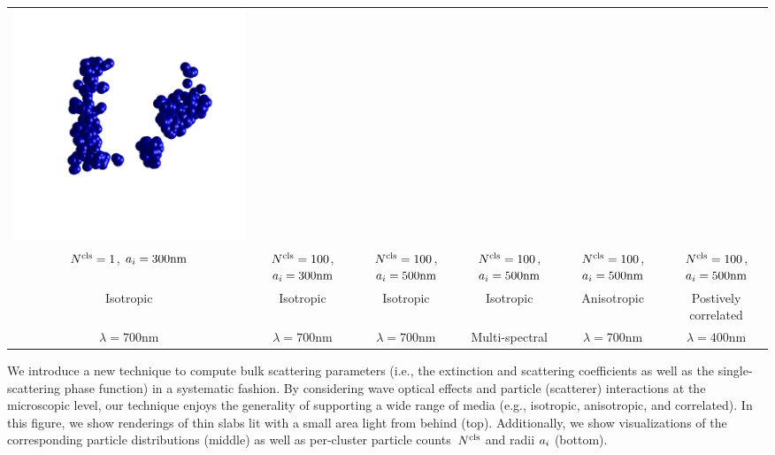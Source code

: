 \begin{teaserfigure}
\begin{tabular}{cccccc}
        \includegraphics[height=\resLen]{images/particle/pos.png}
        \\[-1em]
        ${N^\text{cls}}=1$, $a_i=300\text{nm}$ &
        ${N^\text{cls}}=100$, $a_i=300\text{nm}$ &
        ${N^\text{cls}}=100$, $a_i=500\text{nm}$ &
        ${N^\text{cls}}=100$, $a_i=500\text{nm}$ & 
        ${N^\text{cls}}=100$, $a_i=500\text{nm}$ &
        ${N^\text{cls}}=100$, $a_i=500\text{nm}$
        \\
        Isotropic & Isotropic & Isotropic & Isotropic & Anisotropic & Postively correlated
        \\
        $\lambda=700\text{nm}$ &
        $\lambda=700\text{nm}$ &
        $\lambda=700\text{nm}$ &
        Multi-spectral &
        $\lambda=700\text{nm}$ &
        $\lambda=400\text{nm}$
    \end{tabular}
    \caption{\label{fig:teaser}
        We introduce a new technique to compute bulk scattering parameters (i.e., the extinction and scattering coefficients as well as the single-scattering phase function) in a systematic fashion. By considering wave optical effects and particle (scatterer) interactions at the microscopic level, our technique enjoys the generality of supporting a wide range of media (e.g., isotropic, anisotropic, and correlated).
        In this figure, we show renderings of thin slabs lit with a small area light from behind (top).
        Additionally, we show visualizations of the corresponding particle distributions (middle) as well as per-cluster particle counts~${N^\text{cls}}$ and radii $a_i$ (bottom).
    }
\end{teaserfigure}

